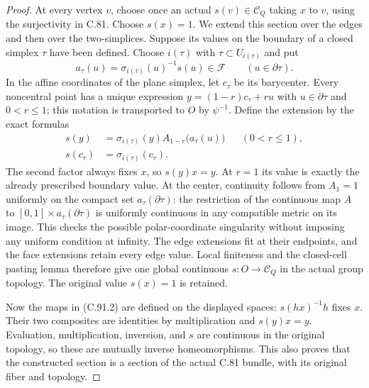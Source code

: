 \begin{proof}
At every vertex $v$, choose once an actual
$s(v)\in\mathscr C_Q$ taking $x$ to $v$,
using the surjectivity in C.81.  Choose $s(x)=1$.
We extend this section over the edges and then over
the two-simplices.  Suppose its values on the boundary
of a closed simplex $\tau$ have been defined.
Choose $i(\tau)$ with $\tau\subset U_{i(\tau)}$ and put
\[
 a_\tau(u)=\sigma_{i(\tau)}(u)^{-1}s(u)\in\mathscr F
                         \qquad(u\in\partial\tau).            \tag{C.91.12}
\]
In the affine coordinates of the plane simplex, let
$c_\tau$ be its barycenter.  Every noncentral point
has a unique expression $y=(1-r)c_\tau+ru$ with
$u\in\partial\tau$ and $0<r\leq1$; this notation
is transported to $O$ by $\psi^{-1}$.
Define the extension by the exact formulas
\[
 \begin{aligned}
 s(y)&=\sigma_{i(\tau)}(y)
                   A_{1-r}\bigl(a_\tau(u)\bigr)
           &&(0<r\leq1),\\
 s(c_\tau)&=\sigma_{i(\tau)}(c_\tau).
 \end{aligned}                                                    \tag{C.91.13}
\]
The second factor always fixes $x$, so $s(y)x=y$.
At $r=1$ its value is exactly the already prescribed
boundary value.  At the center, continuity follows
from $A_1=1$ uniformly on the compact set
$a_\tau(\partial\tau)$: the restriction of the
continuous map $A$ to
$[0,1]\times a_\tau(\partial\tau)$ is uniformly
continuous in any compatible metric on its image.
This checks the possible polar-coordinate singularity
without imposing any uniform condition at infinity.
The edge extensions fit at their endpoints, and
the face extensions retain every edge value.
Local finiteness and the closed-cell pasting lemma
therefore give one global continuous
$s:O\to\mathscr C_Q$ in the actual group topology.
The original value $s(x)=1$ is retained.

Now the maps in (C.91.2) are defined on the displayed
spaces: $s(hx)^{-1}h$ fixes $x$.
Their two composites are identities by multiplication
and $s(y)x=y$.  Evaluation, multiplication, inversion,
and $s$ are continuous in the original topology,
so these are mutually inverse homeomorphisms.
This also proves that the constructed section is a
section of the actual C.81 bundle, with its original
fiber and topology.


\end{proof}
